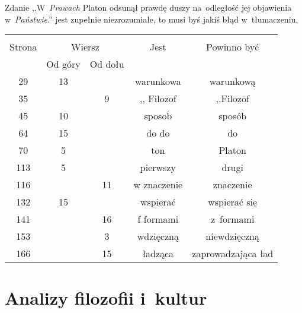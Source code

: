 \documentclass[a4paper,11pt]{article}
\begin{document}
\vspace{\spaceFour}


\start {} Zdanie ,,W~\emph{Prawach} Platon odsunął prawdę
duszy na~odległość jej objawienia w~\emph{Państwie}.'' jest zupełnie
niezrozumiałe, to musi byś jakiś błąd w~tłumaczeniu.



\begin{center}
  \begin{tabular}{|c|c|c|c|c|}
    \hline
    & \multicolumn{2}{c|}{} & & \\
    Strona & \multicolumn{2}{c|}{Wiersz} & Jest
                              & Powinno być \\ \cline{2-3}
    & Od góry & Od dołu & & \\
    \hline
    29  & 13 & & warunkowa & warunkową \\
    35  & &  9 & ,, Filozof %
           & ,,Filozof \\ %
    45  & 10 & & sposob & sposób \\
    64  & 15 & & do do & do \\
    70  &  5 & & ton & Platon \\
    113 &  5 & & pierwszy & drugi \\
    116 & & 11 & w znaczenie & znaczenie \\
    132 & 15 & & wspierać & wspierać się \\
    141 & & 16 & f formami & z~formami \\
    153 & &  3 & wdzięczną & niewdzięczną \\
    166 & & 15 & ładząca & zaprowadzająca ład \\
    \hline
  \end{tabular}
\end{center}

\vspace{\spaceTwo}





\newpage
\section{Analizy filozofii i~kultur}

\vspace{\spaceTwo}
\end{document}
